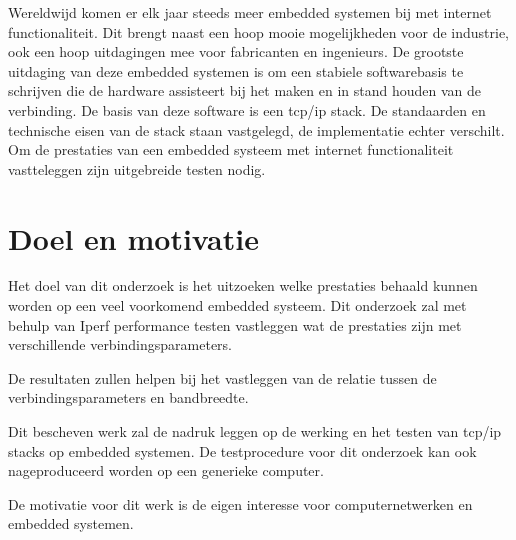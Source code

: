 \documentclass[../DCM2_Verslag.tex]{subfiles}
\begin{document}
Wereldwijd komen er elk jaar steeds meer embedded systemen bij met internet functionaliteit.
Dit brengt naast een hoop mooie mogelijkheden voor de industrie, ook een hoop uitdagingen mee voor fabricanten en ingenieurs. De grootste uitdaging van deze embedded systemen is om een stabiele softwarebasis te schrijven die de hardware assisteert bij het maken en in stand houden van de verbinding. De basis van deze software is een tcp/ip stack. De standaarden en technische eisen van de stack staan vastgelegd, de implementatie echter verschilt. Om de prestaties van een embedded systeem met internet functionaliteit vastteleggen zijn uitgebreide testen nodig. 

\section{Doel en motivatie}
Het doel van dit onderzoek is het uitzoeken welke prestaties behaald kunnen worden op een veel voorkomend embedded systeem. Dit onderzoek zal met behulp van Iperf performance testen vastleggen wat de prestaties zijn met verschillende verbindingsparameters. 

De resultaten zullen helpen bij het vastleggen van de relatie tussen de verbindingsparameters en bandbreedte. 

Dit bescheven werk zal de nadruk leggen op de werking en het testen van tcp/ip stacks op embedded systemen. De testprocedure voor dit onderzoek kan ook nageproduceerd worden op een generieke computer.

De motivatie voor dit werk is de eigen interesse voor computernetwerken en embedded systemen.
\end{document}
